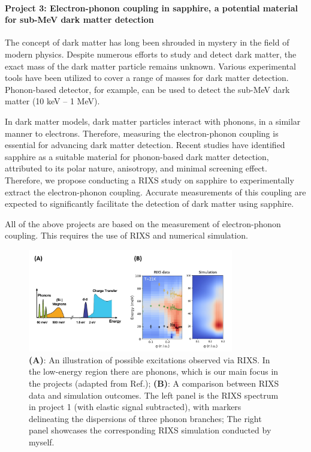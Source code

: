 \documentclass[11pt]{article}
\begin{document}
\paragraph{Project 3: Electron-phonon coupling in sapphire, a potential material for sub-MeV dark matter detection}
The concept of dark matter has long been shrouded in mystery in the field of modern physics. 
Despite numerous efforts to study and detect dark matter\cite{bergstrom_non-baryonic_2000,vogel_dark_2014,essig_first_2012,davidson_updated_2000}, the exact mass of the dark matter particle remains unknown. 
Various experimental tools have been utilized to cover a range of masses for dark matter detection. 
Phonon-based detector, for example, can be used to detect the sub-MeV dark matter (10 keV -- 1 MeV).
  
In dark matter models, dark matter particles interact with phonons, in a similar manner to electrons\cite{griffin_directional_2018}. Therefore, measuring the electron-phonon coupling is essential for advancing dark matter detection. 
Recent studies have identified sapphire as a suitable material for phonon-based dark matter detection, attributed to its polar nature, anisotropy, and minimal screening effect\cite{griffin_directional_2018}.
Therefore, we propose conducting a RIXS study on sapphire to experimentally extract the electron-phonon coupling. Accurate measurements of this coupling are expected to significantly facilitate the detection of dark matter using sapphire.

All of the above projects are based on the measurement of electron-phonon coupling. 
This requires the use of RIXS and numerical simulation.

\begin{figure}[!t]
    \centering
    \includegraphics[width=0.8\textwidth]{figures/new_figure2.jpg}
    \caption{\textbf{(A)}: An illustration of possible excitations observed via RIXS. In the low-energy region there are phonons, which is our main focus in the projects (adapted from Ref.\cite{ament_resonant_2011}); \textbf{(B)}: A comparison between RIXS data and simulation outcomes. The left panel is the RIXS spectrum in project 1 (with elastic signal subtracted), with markers delineating the dispersions of three phonon branches; The right panel showcases the corresponding RIXS simulation conducted by myself.}  
    \label{simulation}
\end{figure}
\end{document}
